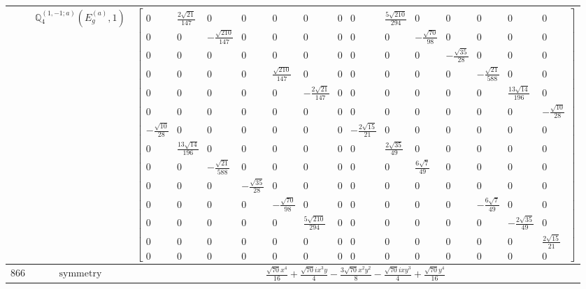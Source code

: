 \documentclass[fleqn,8pt,landscape]{jsarticle}
\begin{document}
\begin{longtable}{ccc}
$  $ & $ \mathbb{Q}_{4}^{(1,-1;a)}(E_{g}^{(a)},1) $ & $ \begin{bmatrix} 0 & \frac{2 \sqrt{21}}{147} & 0 & 0 & 0 & 0 & 0 & 0 & \frac{5 \sqrt{210}}{294} & 0 & 0 & 0 & 0 & 0 \\ 0 & 0 & - \frac{\sqrt{210}}{147} & 0 & 0 & 0 & 0 & 0 & 0 & - \frac{\sqrt{70}}{98} & 0 & 0 & 0 & 0 \\ 0 & 0 & 0 & 0 & 0 & 0 & 0 & 0 & 0 & 0 & - \frac{\sqrt{35}}{28} & 0 & 0 & 0 \\ 0 & 0 & 0 & 0 & \frac{\sqrt{210}}{147} & 0 & 0 & 0 & 0 & 0 & 0 & - \frac{\sqrt{21}}{588} & 0 & 0 \\ 0 & 0 & 0 & 0 & 0 & - \frac{2 \sqrt{21}}{147} & 0 & 0 & 0 & 0 & 0 & 0 & \frac{13 \sqrt{14}}{196} & 0 \\ 0 & 0 & 0 & 0 & 0 & 0 & 0 & 0 & 0 & 0 & 0 & 0 & 0 & - \frac{\sqrt{10}}{28} \\ - \frac{\sqrt{10}}{28} & 0 & 0 & 0 & 0 & 0 & 0 & - \frac{2 \sqrt{15}}{21} & 0 & 0 & 0 & 0 & 0 & 0 \\ 0 & \frac{13 \sqrt{14}}{196} & 0 & 0 & 0 & 0 & 0 & 0 & \frac{2 \sqrt{35}}{49} & 0 & 0 & 0 & 0 & 0 \\ 0 & 0 & - \frac{\sqrt{21}}{588} & 0 & 0 & 0 & 0 & 0 & 0 & \frac{6 \sqrt{7}}{49} & 0 & 0 & 0 & 0 \\ 0 & 0 & 0 & - \frac{\sqrt{35}}{28} & 0 & 0 & 0 & 0 & 0 & 0 & 0 & 0 & 0 & 0 \\ 0 & 0 & 0 & 0 & - \frac{\sqrt{70}}{98} & 0 & 0 & 0 & 0 & 0 & 0 & - \frac{6 \sqrt{7}}{49} & 0 & 0 \\ 0 & 0 & 0 & 0 & 0 & \frac{5 \sqrt{210}}{294} & 0 & 0 & 0 & 0 & 0 & 0 & - \frac{2 \sqrt{35}}{49} & 0 \\ 0 & 0 & 0 & 0 & 0 & 0 & 0 & 0 & 0 & 0 & 0 & 0 & 0 & \frac{2 \sqrt{15}}{21} \\ 0 & 0 & 0 & 0 & 0 & 0 & 0 & 0 & 0 & 0 & 0 & 0 & 0 & 0 \end{bmatrix} $ \\ \hline
$ 866 $ & $ \text{symmetry} $ & $ \frac{\sqrt{70} x^{4}}{16} + \frac{\sqrt{70} i x^{3} y}{4} - \frac{3 \sqrt{70} x^{2} y^{2}}{8} - \frac{\sqrt{70} i x y^{3}}{4} + \frac{\sqrt{70} y^{4}}{16} $ \\

\end{longtable}
\end{document}
